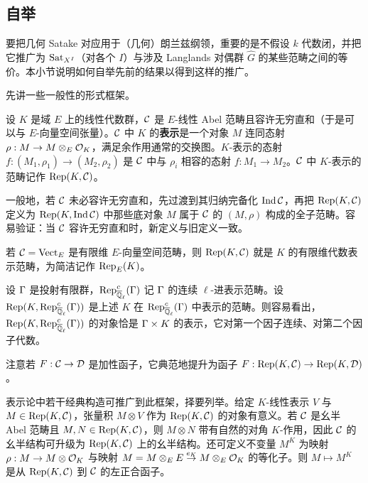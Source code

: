 
\subsection{自举}

要把几何 Satake 对应用于（几何）朗兰兹纲领，重要的是不假设 $k$ 代数闭，并把它推广为 ${\operatorname{Sat}}_{X^I}$（对各个 $I$）与涉及 Langlands 对偶群 $\hat G$ 的某些范畴之间的等价。本小节说明如何自举先前的结果以得到这样的推广。

先讲一些一般性的形式框架。

\begin{dfn}
设 $K$ 是域 $E$ 上的线性代数群，${\mathcal C}$ 是 $E$-线性 Abel 范畴且容许无穷直和（于是可以与 $E$-向量空间张量）。${\mathcal C}$ 中 $K$ 的\textbf{表示}是一个对象 $M$ 连同态射 $\rho: M\to M\otimes_{E}{\mathcal O}_K$，满足余作用通常的交换图。$K$-表示的态射 $f: (M_1,\rho_1)\to (M_2,\rho_2)$ 是 ${\mathcal C}$ 中与 $\rho_i$ 相容的态射 $f:M_1\to M_2$。${\mathcal C}$ 中 $K$-表示的范畴记作 $\operatorname{Rep}(K,{\mathcal C})$。

一般地，若 ${\mathcal C}$ 未必容许无穷直和，先过渡到其归纳完备化 $\operatorname{Ind}{\mathcal C}$，再把 $\operatorname{Rep}(K,{\mathcal C})$ 定义为 $\operatorname{Rep}(K,{\operatorname{Ind}{\mathcal C}})$ 中那些底对象 $M$ 属于 ${\mathcal C}$ 的 $(M,\rho)$ 构成的全子范畴。容易验证：当 ${\mathcal C}$ 容许无穷直和时，新定义与旧定义一致。
\end{dfn}

\begin{ex}
若 ${\mathcal C}=\operatorname{Vect}_E$ 是有限维 $E$-向量空间范畴，则 $\operatorname{Rep}(K,{\mathcal C})$ 就是 $K$ 的有限维代数表示范畴，为简洁记作 $\operatorname{Rep}_E(K)$。
\end{ex}

\begin{ex}\label{KLoc}
设 ${\Gamma}$ 是投射有限群，$\operatorname{Rep}^c_{\overline{{\mathbb Q}}_\ell}({\Gamma})$ 记 ${\Gamma}$ 的连续 $\ell$-进表示范畴。设 $\operatorname{Rep}(K,{\operatorname{Rep}^c_{\overline{{\mathbb Q}}_\ell}({\Gamma})})$ 是上述 $K$ 在 $\operatorname{Rep}^c_{\overline{{\mathbb Q}}_\ell}({\Gamma})$ 中表示的范畴。则容易看出，$\operatorname{Rep}(K,{\operatorname{Rep}^c_{\overline{{\mathbb Q}}_\ell}({\Gamma})})$ 的对象恰是 ${\Gamma}\times K$ 的表示，它对第一个因子连续、对第二个因子代数。
\end{ex}

注意若 $F:{\mathcal C}\to {\mathcal D}$ 是加性函子，它典范地提升为函子 $F:\operatorname{Rep}(K,{{\mathcal C}})\to \operatorname{Rep}(K,{{\mathcal D}})$。

表示论中若干经典构造可推广到此框架，择要列举。给定 $K$-线性表示 $V$ 与 $M\in \operatorname{Rep}(K,{{\mathcal C}})$，张量积 $M\otimes V$ 作为 $\operatorname{Rep}(K,{{\mathcal C}})$ 的对象有意义。若 ${\mathcal C}$ 是幺半 Abel 范畴且 $M,N\in \operatorname{Rep}(K,{{\mathcal C}})$，则 $M\otimes N$ 带有自然的对角 $K$-作用，因此 ${\mathcal C}$ 的幺半结构可升级为 $\operatorname{Rep}(K,{{\mathcal C}})$ 上的幺半结构。还可定义不变量 $M^K$ 为映射 $\rho:M\to M\otimes {\mathcal O}_K$ 与映射 $M=M\otimes_EE\stackrel{e_K}{\to} M\otimes_E{\mathcal O}_K$ 的等化子。则 $M\mapsto M^K$ 是从 $\operatorname{Rep}(K,{{\mathcal C}})$ 到 ${\mathcal C}$ 的左正合函子。

